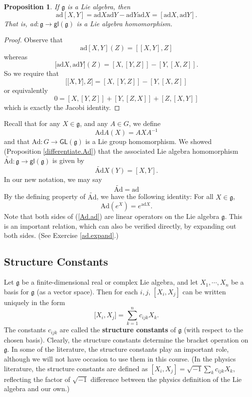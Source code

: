 \documentclass[12pt]{amsbook}
\let \frak = \mathfrak
\theoremstyle{plain}
\newtheorem{proposition}[theorem]{Proposition}
\numberwithin{equation}{chapter}
\numberwithin{theorem}{chapter}
\begin{document}
\begin{proposition}
\label{ad.homo}If $\frak{g}$ is a Lie algebra, then
\[
\mathrm{ad}[X,Y]=\mathrm{ad}X\mathrm{ad}Y-\mathrm{ad}Y\mathrm{ad}%
X=[\mathrm{ad}X,\mathrm{ad}Y]\text{.}%
\]
That is, \textrm{ad}$:\frak{g}\rightarrow\mathsf{gl}(\frak{g})$ is a Lie
algebra homomorphism.
\end{proposition}

\begin{proof}
Observe that
\[
\mathrm{ad}[X,Y](Z)=[[X,Y],Z]
\]
whereas
\[
\lbrack\mathrm{ad}X,\mathrm{ad}Y](Z)=[X,[Y,Z]]-[Y,[X,Z]]\text{.}%
\]
So we require that
\[
\lbrack\lbrack X,Y],Z]=[X,[Y,Z]]-[Y,[X,Z]]
\]
or equivalently
\[
0=[X,[Y,Z]]+[Y,[Z,X]]+[Z,[X,Y]]
\]
which is exactly the Jacobi identity.
\end{proof}

Recall that for any $X\in\frak{g}$, and any $A\in G$, we define
\[
\mathrm{Ad}A(X)=AXA^{-1}%
\]
and that \textrm{Ad}$:G\rightarrow\mathsf{GL}(\frak{g})$ is a Lie group
homomorphism. We showed (Proposition \ref{differentiate.Ad}) that the
associated Lie algebra homomorphism $\widetilde{\mathrm{Ad}}:\frak{g}%
\rightarrow\mathsf{gl}(\frak{g})$ is given by
\[
\widetilde{\mathrm{Ad}}X(Y)=[X,Y]\text{.}%
\]
In our new notation, we may say
\[
\widetilde{\mathrm{Ad}}=\mathrm{ad}%
\]
By the defining property of $\widetilde{\mathrm{Ad}}$, we have the following
identity: For all $X\in\frak{g}$,
\begin{equation}
\mathrm{Ad}(e^{X})=e^{\mathrm{ad}X}\text{.}\label{Ad.ad}%
\end{equation}
Note that both sides of (\ref{Ad.ad}) are linear operators on the Lie algebra
$\frak{g}$. This is an important relation, which can also be verified
directly, by expanding out both sides. (See Exercise \ref{ad.expand}.)

\subsection{Structure Constants}

Let $\frak{g}$ be a finite-dimensional real or complex Lie algebra, and let
$X_{1},\cdots,X_{n}$ be a basis for $\frak{g}$ (as a vector space). Then for
each $i,j$, $[X_{i},X_{j}]$ can be written uniquely in the form
\[
\lbrack X_{i},X_{j}]=\sum_{k=1}^{n}c_{ijk}X_{k}\text{.}%
\]
The constants $c_{ijk}$ are called the \textbf{structure constants} of
$\frak{g}$ (with respect to the chosen basis). Clearly, the structure
constants determine the bracket operation on $\frak{g}$. In some of the
literature, the structure constants play an important role, although we will
not have occasion to use them in this course. (In the physics literature, the
structure constants are defined as $[X_{i},X_{j}]=\sqrt{-1}\sum_{k}%
c_{ijk}X_{k}$, reflecting the factor of $\sqrt{-1}$ difference between the
physics definition of the Lie algebra and our own.)
\end{document}
